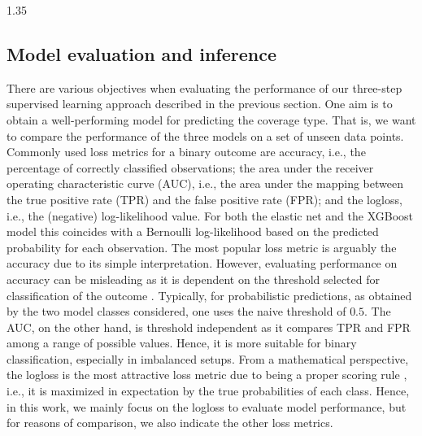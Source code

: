 \documentclass[12pt,a4paper]{article}
\begin{document}
\begin{spacing}{1.35}
\subsection{Model evaluation and inference}
\label{sec:model_eval}
There are various objectives when evaluating the performance of our three-step supervised learning approach described in the previous section. One aim is to obtain a well-performing model for predicting the coverage type. That is, we want to compare the performance of the three models on a set of unseen data points. Commonly used loss metrics for a binary outcome are accuracy, i.e., the percentage of correctly classified observations; the area under the receiver operating characteristic curve (AUC), i.e., the area under the mapping between the true positive rate (TPR) and the false positive rate (FPR); %
and the logloss, i.e., the (negative) log-likelihood value. For both the elastic net and the XGBoost model this coincides with a Bernoulli log-likelihood based on the predicted probability for each observation. 
The most popular loss metric is arguably the accuracy due to its simple interpretation. However, evaluating performance on accuracy can be misleading as it is dependent on the threshold selected for classification of the outcome \citep[see, e.g.,][]{tholke23acc}. Typically, for probabilistic predictions, as obtained by the two model classes considered, one uses the naive threshold of $0.5$. The AUC, on the other hand, is threshold independent as it compares TPR and FPR among a range of possible values. Hence, it is more suitable for binary classification, especially in imbalanced setups. From a mathematical perspective, the logloss is the most attractive loss metric due to being a proper scoring rule \citep{waghmare25scoring}, i.e., it is maximized in expectation by the true probabilities of each class. Hence, in this work, we mainly focus on the logloss to evaluate model performance, but for reasons of comparison, we also indicate the other loss metrics. 


\end{spacing}
\end{document}
